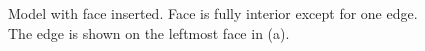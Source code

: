 \documentclass[a4paper, 12pt]{article}
\begin{document}
\begin{figure}[H]
  \centering
  \caption{Model with face inserted. 
        Face is fully interior except for one edge.
        The edge is shown on the leftmost face in (a).}
  \label{fig:face3model}
\end{figure}
\end{document}
